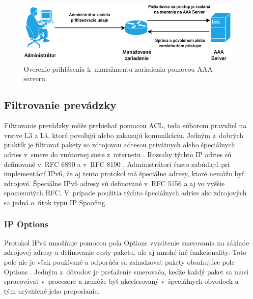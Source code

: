 \begin{figure}[H]
	\begin{center}
		\includegraphics[scale=1.1]{obrazky/AAA.pdf}
	\end{center}
	\caption[Manažment zariadenia pomocou AAA]{Overenie prihlásenia k~manažmentu zariadenia pomocou AAA serveru.}
	\label{fig:aaa-mngmt}
\end{figure} 



\subsection{Filtrovanie prevádzky}
Filtrovanie prevádzky môže prebiehať pomocou ACL, teda súborom pravidiel na vrstve L3 a L4, ktoré povoľujú alebo zakazujú komunikáciu. Jedným z~dobrých praktík je filtrovať pakety so zdrojovou adresou privátnych alebo špeciálnych adries v~smere do vnútornej siete z~internetu \cite{Jackson2010}. Rozsahy týchto IP adries sú definované v~RFC 6890 \cite{rfc6890al6BqxiLuoAdpLeG} a v~RFC 8190 \cite{rfc8190O1cp1uhrCiYj0LYK}. Administrátori často zabúdajú pri implementácií IPv6, že aj tento protokol má špeciálne adresy, ktoré nemôžu byť zdrojové. Špeciálne IPv6 adresy sú definované v~RFC 5156 \cite{rfc5156lPYdBFaqWC5RwyJI} a aj vo vyššie spomenutých RFC. V~prípade použitia týchto špeciálnych adries ako zdrojových sa jedná o~útok typu IP Spoofing.

\subsubsection{IP Options}
Protokol IPv4 umožňuje pomocou poľa Options vynútenie smerovania na základe zdrojovej adresy a definovanie cesty paketu, ale aj mnohé iné funkcionality. Toto pole nie je však používané a odporúča sa zahadzovať pakety obsahujúce pole Options \cite{Singh2018}. Jedným z~dôvodov je preťaženie smerovača, keďže každý paket sa musí spracovávať v~procesore a nemôže byť akcelerovaný v~špeciálnych obvodoch a tým urýchlené jeho preposlanie. 


